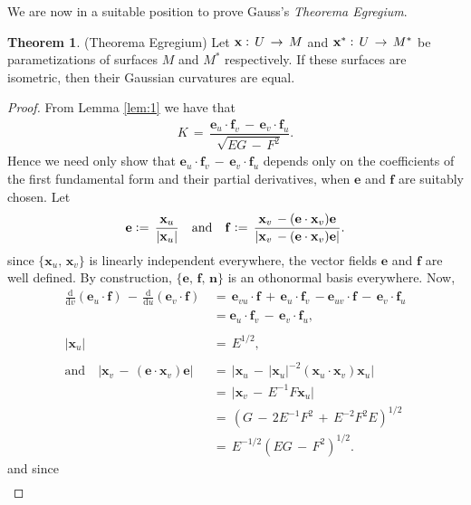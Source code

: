 \documentclass{UKZNcomp}
\newcommand{\vect}[1]{\mathbf{#1}} %
\newcommand\deriv[2]{\frac{\mathrm d #1}{\mathrm d #2}}
\theoremstyle{definition}
\newtheorem{theorem}[definition]{Theorem}
\theoremstyle{remark}
\begin{document}
We are now in a suitable position to prove Gauss's \textit{Theorema Egregium}.

\begin{theorem}{(Theorema Egregium)}
Let $\vect x\vcentcolon\,U\,\to\,M$ and $\vect x^*\vcentcolon\,U\,\to\,M^*$ be parametizations of surfaces $M$ and $M^*$ respectively. If these surfaces are isometric, then their Gaussian curvatures are equal.
\end{theorem}

\begin{proof}
From Lemma \ref{lem:1} we have that
\begin{align*}
K\,=\,\dfrac{\vect e_u\cdot\vect f_v\,-\,\vect e_v\cdot\vect f_u}{\sqrt{EG\,-\,F^2}}.
\end{align*}
Hence we need only show that $\vect e_u\cdot\vect f_v\,-\,\vect e_v\cdot\vect f_u$ depends only on the coefficients of the first fundamental form and their partial derivatives, when $\vect e$ and $\vect f$ are suitably chosen. Let
\begin{align*}
\vect e\vcentcolon=\,\dfrac{\vect x_u}{\lvert\vect x_u\rvert}\quad\text{and}\quad\vect f\vcentcolon = \,\dfrac{\vect x_v\,-(\vect e\cdot\vect x_v)\vect e}{\lvert \vect x_v\,-(\vect e\cdot\vect x_v)\vect e\rvert}.
\end{align*}
since $\{\vect x_u,\,\vect x_v\}$ is linearly independent everywhere, the vector fields $\vect e$ and $\vect f$ are well defined. By construction, $\{\vect e,\,\vect f,\,\vect n\}$ is an othonormal basis everywhere. Now,
\begin{align*}
\deriv{}{v}(\vect e_u\cdot\vect f)\,-\,\deriv{}{u}(\vect e_v\cdot\vect f)\,&=\,\vect e_{vu}\cdot\vect f\,+\,\vect e_u\cdot\vect f_v\,-\vect e_{uv}\cdot\vect f\,-\,\vect e_v\cdot\vect f_u\\
&=\vect e_u\cdot\vect f_v\,-\,\vect e_v\cdot\vect f_u,\\\\
\lvert\vect x_u\rvert\,&=\,E^{1/2},\\\\
\text{and}\quad\lvert\vect x_v\,-\,(\vect e\cdot\vect x_v)\vect e\rvert\,&=\,\lvert \vect x_u\,-\,\lvert\vect x_u\rvert^{-2}(\vect x_u\cdot\vect x_v)\vect x_u \rvert\\
&=\,\lvert \vect x_v\,-\,E^{-1}F\vect x_u \rvert \\
&=\,(G\,-\,2E^{-1}F^2\,+\,E^{-2}F^2E)^{1/2}\\
&=\,E^{-1/2}(EG\,-\,F^2)^{1/2}.
\end{align*}
and since
\begin{align*}

\end{align*}
\end{proof}
\end{document}
